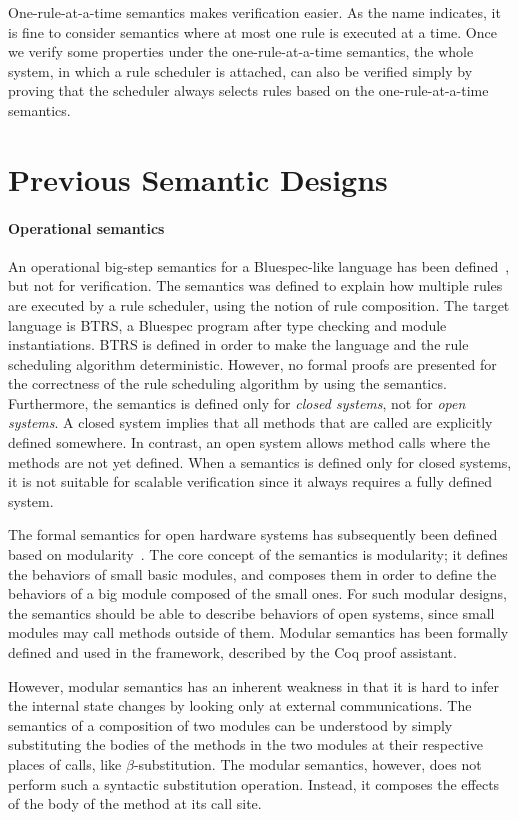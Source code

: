 One-rule-at-a-time semantics makes verification easier. As the name
indicates, it is fine to consider semantics where at most one rule is
executed at a time. Once we verify some properties under the
one-rule-at-a-time semantics, the whole system, in which a rule
scheduler is attached, can also be verified simply by proving that the
scheduler always selects rules based on the one-rule-at-a-time
semantics.

\section{Previous Semantic Designs}
\label{sec:related-works}

\paragraph{Operational semantics}

An operational big-step semantics for a Bluespec-like language has
been defined~\cite{nirav-memocode}, but not for verification. The
semantics was defined to explain how multiple rules are executed by a
rule scheduler, using the notion of rule composition. The target
language is BTRS, a Bluespec program after type checking and module
instantiations. BTRS is defined in order to make the language and the
rule scheduling algorithm deterministic. However, no formal proofs are
presented for the correctness of the rule scheduling algorithm by
using the semantics. Furthermore, the semantics is defined only for
\emph{closed systems}, not for \emph{open systems}. A closed system
implies that all methods that are called are explicitly defined
somewhere. In contrast, an open system allows method calls where the
methods are not yet defined. When a semantics is defined only for
closed systems, it is not suitable for scalable verification since it
always requires a fully defined system.

The formal semantics for open hardware systems has subsequently been
defined based on modularity~\cite{murali-thesis}. The core concept of
the semantics is modularity; it defines the behaviors of small basic
modules, and composes them in order to define the behaviors of a big
module composed of the small ones. For such modular designs, the
semantics should be able to describe behaviors of open systems, since
small modules may call methods outside of them. Modular semantics has
been formally defined and used in the \Kami{} framework, described by
the Coq proof assistant.

However, modular semantics has an inherent weakness in that it is hard
to infer the internal state changes by looking only at external
communications. The semantics of a composition of two modules can be
understood by simply substituting the bodies of the methods in the two
modules at their respective places of calls, like
$\beta$-substitution. The modular semantics, however, does not perform
such a syntactic substitution operation. Instead, it composes the
effects of the body of the method at its call site.

